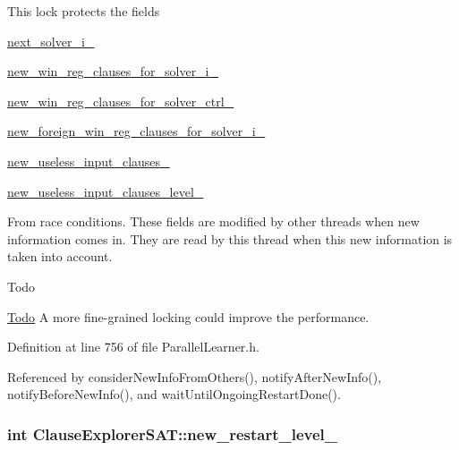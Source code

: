 This lock protects the fields 
\begin{DoxyItemize}
\item \hyperlink{classClauseExplorerSAT_abbaa9b938df08f811dd361216527176c}{next\-\_\-solver\-\_\-i\-\_\-} 
\item \hyperlink{classClauseExplorerSAT_a2c3e73b4c0529b9139354a965d34e81f}{new\-\_\-win\-\_\-reg\-\_\-clauses\-\_\-for\-\_\-solver\-\_\-i\-\_\-} 
\item \hyperlink{classClauseExplorerSAT_a7d923928f3cb6209b29f5cc5104b5fe2}{new\-\_\-win\-\_\-reg\-\_\-clauses\-\_\-for\-\_\-solver\-\_\-ctrl\-\_\-} 
\item \hyperlink{classClauseExplorerSAT_a70c8edd590d75994ee354d591909cd35}{new\-\_\-foreign\-\_\-win\-\_\-reg\-\_\-clauses\-\_\-for\-\_\-solver\-\_\-i\-\_\-} 
\item \hyperlink{classClauseExplorerSAT_a3d1bdb9a6484c85af655a4eed1ee5f19}{new\-\_\-useless\-\_\-input\-\_\-clauses\-\_\-} 
\item \hyperlink{classClauseExplorerSAT_a67eeafbba9da9c87534f7ef26531a57a}{new\-\_\-useless\-\_\-input\-\_\-clauses\-\_\-level\-\_\-} 
\end{DoxyItemize}From race conditions. These fields are modified by other threads when new information comes in. They are read by this thread when this new information is taken into account.

\begin{DoxyRefDesc}{Todo}
\item[\hyperlink{todo__todo000012}{Todo}]A more fine-\/grained locking could improve the performance. \end{DoxyRefDesc}


Definition at line 756 of file Parallel\-Learner.\-h.



Referenced by consider\-New\-Info\-From\-Others(), notify\-After\-New\-Info(), notify\-Before\-New\-Info(), and wait\-Until\-Ongoing\-Restart\-Done().

\hypertarget{classClauseExplorerSAT_adf9bfe4390d34e57e25f269afa1e7b25}{
\subsubsection[{new\-\_\-restart\-\_\-level\-\_\-}]{\setlength{\rightskip}{0pt plus 5cm}int Clause\-Explorer\-S\-A\-T\-::new\-\_\-restart\-\_\-level\-\_\-\hspace{0.3cm}{\ttfamily [protected]}}}\label{classClauseExplorerSAT_adf9bfe4390d34e57e25f269afa1e7b25}



